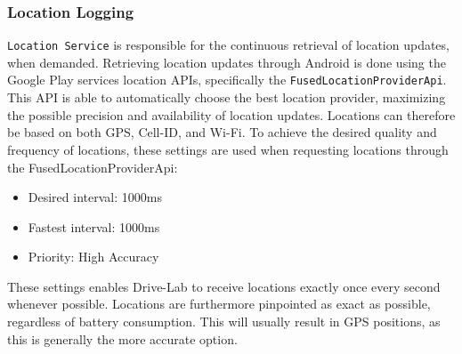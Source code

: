 \subsubsection{Location Logging}\label{subsubsec:location_logging}
\texttt{Location Service} is responsible for the continuous retrieval of location updates, when demanded. Retrieving location updates through Android is done using the Google Play services location APIs, specifically the \texttt{FusedLocationProviderApi}\citep{android_fusedlocationproviderapi}. This API is able to automatically choose the best location provider, maximizing the possible precision and availability of location updates. Locations can therefore be based on both GPS, Cell-ID, and Wi-Fi. To achieve the desired quality and frequency of locations, these settings are used when requesting locations through the FusedLocationProviderApi:

\begin{itemize}
\item Desired interval: 1000ms
\item Fastest interval: 1000ms
\item Priority: High Accuracy
\end{itemize}

These settings enables Drive-Lab to receive locations exactly once every second whenever possible. Locations are furthermore pinpointed as exact as possible, regardless of battery consumption. This will usually result in GPS positions, as this is generally the more accurate option.
